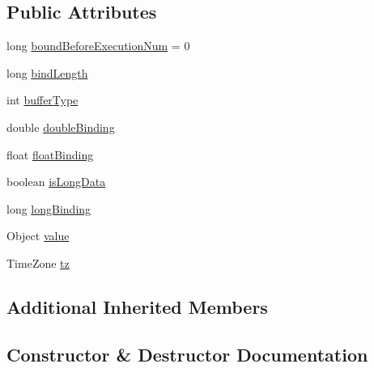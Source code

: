 \subsection*{Public Attributes}
\begin{DoxyCompactItemize}
\item 
long \mbox{\hyperlink{classcom_1_1mysql_1_1cj_1_1_server_prepared_query_bind_value_a3ab8f65eaf859a7ff98183e245cae9ac}{bound\+Before\+Execution\+Num}} = 0
\item 
long \mbox{\hyperlink{classcom_1_1mysql_1_1cj_1_1_server_prepared_query_bind_value_aa87bf817b49e78e7fb23da67b0f34acb}{bind\+Length}}
\item 
int \mbox{\hyperlink{classcom_1_1mysql_1_1cj_1_1_server_prepared_query_bind_value_a4dd8969b65d3c51f18e5ee05f6754aa7}{buffer\+Type}}
\item 
double \mbox{\hyperlink{classcom_1_1mysql_1_1cj_1_1_server_prepared_query_bind_value_aa49ba26e72e2d7780a5b9f915a4ad1c1}{double\+Binding}}
\item 
float \mbox{\hyperlink{classcom_1_1mysql_1_1cj_1_1_server_prepared_query_bind_value_abd77ba808c6e9ad053f1d0f4046deb07}{float\+Binding}}
\item 
boolean \mbox{\hyperlink{classcom_1_1mysql_1_1cj_1_1_server_prepared_query_bind_value_ab22e024ff3b3820378df1262c46608b7}{is\+Long\+Data}}
\item 
long \mbox{\hyperlink{classcom_1_1mysql_1_1cj_1_1_server_prepared_query_bind_value_a2ee1b71337514a7edd370aab5cdc7003}{long\+Binding}}
\item 
Object \mbox{\hyperlink{classcom_1_1mysql_1_1cj_1_1_server_prepared_query_bind_value_aa595f7da76ae912b08b89998edc62018}{value}}
\item 
Time\+Zone \mbox{\hyperlink{classcom_1_1mysql_1_1cj_1_1_server_prepared_query_bind_value_ab5b37e608f04a2ebd03addfcbd53c536}{tz}}
\end{DoxyCompactItemize}
\subsection*{Additional Inherited Members}


\subsection{Constructor \& Destructor Documentation}
\mbox{\label{classcom_1_1mysql_1_1cj_1_1_server_prepared_query_bind_value_a955e5b4560fdfb4c41537aabdc08015c}} 
